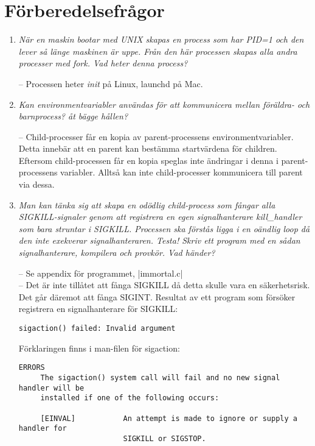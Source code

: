 \documentclass[paper=a4, fontsize=11pt]{scrartcl} %
\numberwithin{equation}{section} %
\numberwithin{figure}{section} %
\numberwithin{table}{section} %
\begin{document}
\section{Förberedelsefrågor}
\begin{enumerate}[1)]
\item \emph{När en maskin bootar med UNIX skapas en process som har PID=1 och
  den lever så länge maskinen är uppe. Från den här processen skapas alla andra
processer med fork. Vad heter denna process?}

-- Processen heter \emph{init} på Linux, launchd på Mac.

\item \emph{Kan environmentvariabler användas för att kommunicera mellan
  föräldra- och barnprocess? åt bägge hållen?}

-- Child-processer får en kopia av parent-processens environmentvariabler.
Detta innebär att en parent kan bestämma startvärdena för children.
Eftersom child-processen får en kopia speglas inte ändringar i denna i
parent-processens variabler. Alltså kan inte child-processer kommunicera till
parent via dessa.

\item \emph{Man kan tänka sig att skapa en odödlig child-process som fångar
  alla SIGKILL-signaler genom att registrera en egen signalhanterare
kill\_handler som bara struntar i SIGKILL. Processen ska förstås ligga i en
oändlig loop då den inte exekverar signalhanteraren. Testa! Skriv ett program
med en sådan signalhanterare, kompilera och provkör. Vad händer?}

-- Se appendix för programmet, |immortal.c| \\
-- Det är inte tillåtet att fånga SIGKILL då detta skulle vara en
säkerhetsrisk. Det går däremot att fånga SIGINT.
Resultat av ett program som försöker registrera en signalhanterare för SIGKILL:

\begin{verbatim}
sigaction() failed: Invalid argument
\end{verbatim}

Förklaringen finns i man-filen för sigaction:
\begin{verbatim}
ERRORS
     The sigaction() system call will fail and no new signal handler will be
     installed if one of the following occurs:

     [EINVAL]           An attempt is made to ignore or supply a handler for
                        SIGKILL or SIGSTOP.
\end{verbatim}


\end{enumerate}
\end{document}

